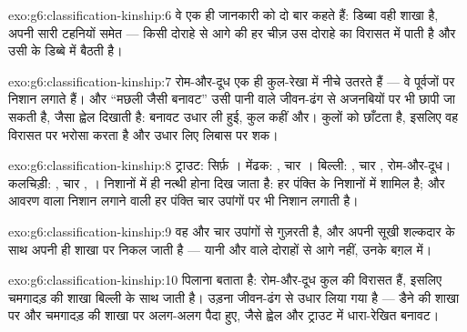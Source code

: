 \begin{solution}{exo:g6:classification-kinship:6}
वे एक ही जानकारी को दो बार कहते हैं: डिब्बा वही शाखा है, अपनी सारी
टहनियों समेत --- किसी दोराहे से आगे की हर चीज़ उस दोराहे का 
विरासत में पाती है और उसी के डिब्बे में बैठती है।
\end{solution}

\begin{solution}{exo:g6:classification-kinship:7}
रोम-और-दूध एक ही कुल-रेखा में नीचे उतरते हैं --- वे पूर्वजों पर निशान
लगाते हैं। और ``मछली जैसी बनावट'' उसी पानी वाले जीवन-ढंग से अजनबियों पर
भी छापी जा सकती है, जैसा ह्वेल दिखाती है: बनावट उधार ली हुई, कुल कहीं
और।  कुलों को छाँटता है, इसलिए वह विरासत पर भरोसा करता है और
उधार लिए लिबास पर शक।
\end{solution}

\begin{solution}{exo:g6:classification-kinship:8}
ट्राउट: सिर्फ़ । मेंढक: , चार । बिल्ली: , चार ,
रोम-और-दूध। कलचिड़ी: , चार , । निशानों में ही नत्थी होना
दिख जाता है: हर पंक्ति के निशानों में  शामिल है; और आवरण वाला निशान
लगाने वाली हर पंक्ति चार उपांगों पर भी निशान लगाती है।
\end{solution}

\begin{solution}{exo:g6:classification-kinship:9}
वह  और चार उपांगों से गुज़रती है, और अपनी सूखी शल्कदार  के साथ
अपनी ही शाखा पर निकल जाती है --- यानी  और  वाले दोराहों से आगे
नहीं, उनके बग़ल में।
\end{solution}

\begin{solution}{exo:g6:classification-kinship:10}
 पिलाना  बताता है: रोम-और-दूध  कुल की विरासत हैं,
इसलिए चमगादड़ की शाखा बिल्ली के साथ जाती है। उड़ना जीवन-ढंग से उधार लिया
गया है --- डैने  की शाखा पर और चमगादड़ की शाखा पर अलग-अलग पैदा
हुए, जैसे ह्वेल और ट्राउट में धारा-रेखित बनावट।
\end{solution}

